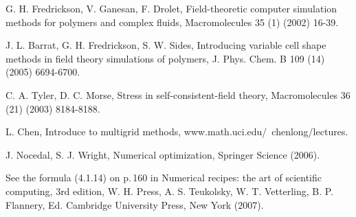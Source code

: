 \documentclass[final,1p,times]{elsarticle}
\begin{document}
\begin{thebibliography}{100}
G. H. Fredrickson, V. Ganesan, F. Drolet,
{Field-theoretic computer simulation methods for polymers and complex fluids},
{Macromolecules} 35 (1) (2002) 16-39.

J. L. Barrat, G. H. Fredrickson, S. W. Sides,
{Introducing variable cell shape methods in field theory simulations of polymers},
{J. Phys. Chem. B} 109 (14) (2005) 6694-6700.

{C. A. Tyler, D. C. Morse},
{Stress in self-consistent-field theory}, {Macromolecules} 36 (21) (2003) 8184-8188.

{L. Chen},
{Introduce to multigrid methods},
www.math.uci.edu/~chenlong/lectures.


J. Nocedal, S. J. Wright, 
{Numerical optimization},
Springer Science (2006).

See the formula (4.1.14) on p.\,160
in {Numerical recipes: the art of scientific computing}, 3rd edition,
W. H. Press, A. S. Teukolsky, W. T. Vetterling, B. P. Flannery, Ed. Cambridge
University Press, New York (2007).


%
%
%
%
%
%
%

%
%
%


\end{thebibliography}
\end{document}
